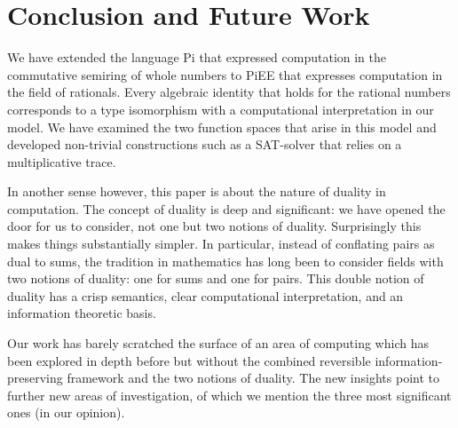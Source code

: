 \documentclass[preprint]{sigplanconf}
\begin{document}
\section{Conclusion and Future Work}
\label{sec:conc}

We have extended the language {{Pi}} that expressed computation
in the commutative semiring of whole numbers to {{PiEE}} that
expresses computation in the field of rationals.  Every algebraic
identity that holds for the rational numbers corresponds to a type
isomorphism with a computational interpretation in our model. We have
examined the two function spaces that arise in this model and
developed non-trivial constructions such as a SAT-solver that relies
on a multiplicative trace.

In another sense however, this paper is about the nature of duality in
computation. 
The concept of duality is deep and significant: we have opened the
door for us to consider, not one but two notions of
duality. Surprisingly this makes things substantially simpler. In
particular, instead of conflating pairs as dual to sums, the tradition
in mathematics has long been to consider fields with two notions of
duality: one for sums and one for pairs. This double notion of duality
has a crisp semantics, clear computational interpretation, and an
information theoretic basis.

Our work has barely scratched the surface of an area of computing which has
been explored in depth before but without the combined reversible
information-preserving framework and the two notions of duality. The new
insights point to further new areas of investigation, of which we mention
the three most significant ones (in our opinion).

\end{document}
